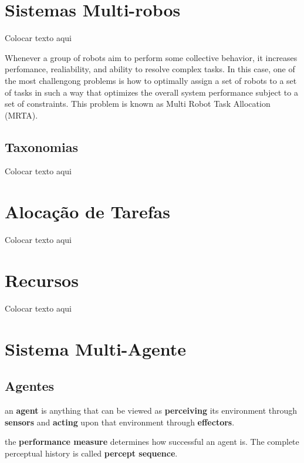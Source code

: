 \section{Sistemas Multi-robos} \label{sec:sec1_2}
Colocar texto aqui

Whenever a group of robots aim to perform some collective behavior, it increases perfomance, realiability, and ability to resolve complex tasks. In this case, one of the most challengong problems is how to optimally assign a set of robots to a set of tasks in such a way that optimizes the overall system performance subject to a set of constraints. This problem is known as Multi Robot Task Allocation (MRTA).

\subsection{Taxonomias} \label{sub:sub1_2_1}
Colocar texto aqui

\section{Alocação de Tarefas} \label{sec:sec1_3}
Colocar texto aqui

\section{Recursos} \label{sec:sec1_4}

Colocar texto aqui

\section{Sistema Multi-Agente}

\subsection{Agentes}


an \textbf{agent} is anything that can be viewed as \textbf{perceiving} its environment through \textbf{sensors} and \textbf{acting} upon that environment through \textbf{effectors}.


the \textbf{performance measure} determines how successful an agent is. The complete perceptual history is called \textbf{percept sequence}.

